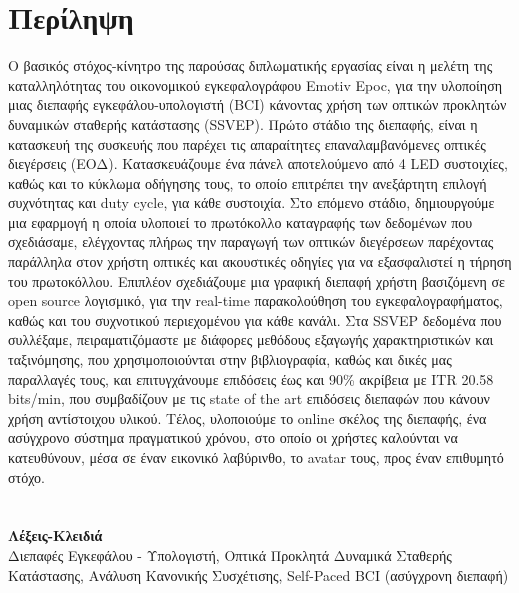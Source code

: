 
\chapter{Περίληψη}
\par Ο βασικός στόχος-κίνητρο της παρούσας διπλωματικής εργασίας είναι η μελέτη της καταλληλότητας του οικονομικού εγκεφαλογράφου Emotiv Epoc, για την υλοποίηση μιας διεπαφής εγκεφάλου-υπολογιστή (BCI) κάνοντας χρήση των οπτικών προκλητών δυναμικών σταθερής κατάστασης (SSVEP). Πρώτο στάδιο της διεπαφής, είναι η κατασκευή της συσκευής που παρέχει τις απαραίτητες επαναλαμβανόμενες οπτικές διεγέρσεις (ΕΟΔ). Κατασκευάζουμε ένα πάνελ αποτελούμενο από 4 LED συστοιχίες, καθώς και το κύκλωμα οδήγησης τους, το οποίο επιτρέπει την ανεξάρτητη επιλογή συχνότητας και duty cycle, για κάθε συστοιχία. Στο επόμενο στάδιο, δημιουργούμε μια εφαρμογή η οποία υλοποιεί το πρωτόκολλο καταγραφής των δεδομένων που σχεδιάσαμε, ελέγχοντας πλήρως την παραγωγή των οπτικών διεγέρσεων παρέχοντας παράλληλα στον χρήστη οπτικές και ακουστικές οδηγίες για να εξασφαλιστεί η τήρηση του πρωτοκόλλου. Επιπλέον σχεδιάζουμε μια γραφική διεπαφή χρήστη βασιζόμενη σε open source λογισμικό, για την real-time παρακολούθηση του εγκεφαλογραφήματος, καθώς και του συχνοτικού περιεχομένου για κάθε κανάλι. Στα SSVEP δεδομένα που συλλέξαμε, πειραματιζόμαστε με διάφορες μεθόδους εξαγωγής χαρακτηριστικών και ταξινόμησης, που χρησιμοποιούνται στην βιβλιογραφία, καθώς και δικές μας παραλλαγές τους, και επιτυγχάνουμε επιδόσεις έως και 90\% ακρίβεια με ITR 20.58 bits/min, που συμβαδίζουν με τις state of the art επιδόσεις διεπαφών που κάνουν χρήση αντίστοιχου υλικού. Τέλος, υλοποιούμε το online σκέλος της διεπαφής, ένα ασύγχρονο σύστημα πραγματικού χρόνου, στο οποίο οι χρήστες καλούνται να κατευθύνουν, μέσα σε έναν εικονικό λαβύρινθο, το avatar τους, προς έναν επιθυμητό στόχο.
 \\\\\\
 \large{\textbf{Λέξεις-Κλειδιά}}\\
 Διεπαφές Εγκεφάλου - Υπολογιστή, Οπτικά Προκλητά Δυναμικά Σταθερής Κατάστασης, Ανάλυση Κανονικής Συσχέτισης, Self-Paced BCI (ασύγχρονη διεπαφή)
 
 \clearpage  %


